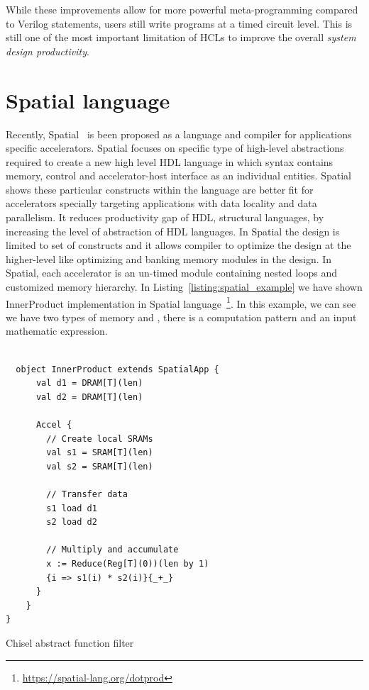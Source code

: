 While these improvements allow for more powerful meta-programming compared to Verilog  statements, users still write programs at a timed circuit level. This is still one of the most important limitation of HCLs to improve the overall \emph{system design productivity}.

\section{Spatial language}
Recently, Spatial~\cite{david_PLDI_2018_spatial} is been proposed as a language and compiler for applications specific accelerators.
Spatial focuses on specific type of high-level abstractions required to create a new high level HDL language in which syntax contains memory, control and accelerator-host interface as an individual entities.
Spatial shows these particular constructs within the language are better fit for accelerators specially targeting applications with data locality and data parallelism.
It reduces productivity gap of HDL, structural languages, by increasing the level of abstraction of HDL languages.
In Spatial the design is limited to set of constructs and it allows compiler to optimize the design at the higher-level like optimizing and banking memory modules in the design.
In Spatial, each accelerator is an un-timed module containing  nested loops and customized memory hierarchy. In Listing~\ref{listing:spatial_example} we have shown InnerProduct implementation in Spatial language~\footnote{\url{https://spatial-lang.org/dotprod}}.
In this example, we can see we have two types of memory  and , there is a  computation pattern and an input mathematic expression.

\begin{listing}[ht]
    \begin{verbatim}

  object InnerProduct extends SpatialApp {
      val d1 = DRAM[T](len)
      val d2 = DRAM[T](len)

      Accel {
        // Create local SRAMs
        val s1 = SRAM[T](len)
        val s2 = SRAM[T](len)
        
        // Transfer data
        s1 load d1
        s2 load d2
        
        // Multiply and accumulate
        x := Reduce(Reg[T](0))(len by 1)
        {i => s1(i) * s2(i)}{_+_} 
      }
    }
}

    \end{verbatim}
    \caption{Chisel abstract function filter}
    \label{listing:spatial_example}
\end{listing}

